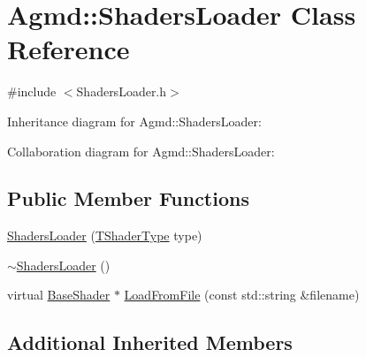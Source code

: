 \hypertarget{class_agmd_1_1_shaders_loader}{\section{Agmd\+:\+:Shaders\+Loader Class Reference}
\label{class_agmd_1_1_shaders_loader}
}


{\ttfamily \#include $<$Shaders\+Loader.\+h$>$}



Inheritance diagram for Agmd\+:\+:Shaders\+Loader\+:


Collaboration diagram for Agmd\+:\+:Shaders\+Loader\+:
\subsection*{Public Member Functions}
\begin{DoxyCompactItemize}
\item 
\hyperlink{class_agmd_1_1_shaders_loader_af2a02b0656a724e2f43e2d81649fe9e0}{Shaders\+Loader} (\hyperlink{namespace_agmd_a162a493eaff1589f07a505806e6724b4}{T\+Shader\+Type} type)
\item 
\hyperlink{class_agmd_1_1_shaders_loader_acc6430db70d2cd46f47df119a1521f79}{$\sim$\+Shaders\+Loader} ()
\item 
virtual \hyperlink{class_agmd_1_1_base_shader}{Base\+Shader} $\ast$ \hyperlink{class_agmd_1_1_shaders_loader_a0a75b8e31b200efb7e64f65d4ce773f3}{Load\+From\+File} (const std\+::string \&filename)
\end{DoxyCompactItemize}
\subsection*{Additional Inherited Members}


